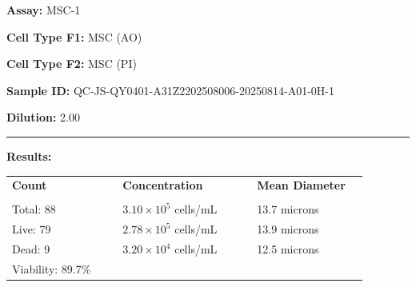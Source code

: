 \documentclass[UTF8,10pt,a4paper,fontset=fandol]{ctexart}
\newcommand{\fieldvalue}[1]{#1}
\begin{document}
\newpage

\noindent\textbf{Assay:} 
\fieldvalue{MSC-1}

\medskip
\noindent\textbf{Cell Type F1:} 
\fieldvalue{MSC (AO)}

\noindent\textbf{Cell Type F2:} 
\fieldvalue{MSC (PI)}

\medskip
\noindent\textbf{Sample ID:} 
\fieldvalue{QC-JS-QY0401-A31Z2202508006-20250814-A01-0H-1}

\noindent\textbf{Dilution:} 
\fieldvalue{2.00}

\medskip
\hrule
\medskip

\noindent\textbf{Results:}

\medskip
\noindent
\begin{tabular}{@{}p{0.29\linewidth}p{0.34\linewidth}p{0.29\linewidth}@{}}
\textbf{Count} & \textbf{Concentration} & \textbf{Mean Diameter} \\
\underline{\hspace{0.23\linewidth}} &
\underline{\hspace{0.28\linewidth}} &
\underline{\hspace{0.23\linewidth}} \\[-2pt]

Total:
\fieldvalue{88}
&
\fieldvalue{$3.10\times10^5$ cells/mL}
&
\fieldvalue{13.7 microns}
\\

Live:
\fieldvalue{79}
&
\fieldvalue{$2.78\times10^5$ cells/mL}
&
\fieldvalue{13.9 microns}
\\

Dead:
\fieldvalue{9}
&
\fieldvalue{$3.20\times10^4$ cells/mL}
&
\fieldvalue{12.5 microns}
\\

Viability:
\fieldvalue{89.7\%}
&
&
\end{tabular}
\end{document}
